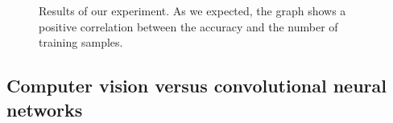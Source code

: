 \begin{figure}[h]
  \begin{center}
  \end{center}
  \label{fig:validaton-plot}
  \caption{Results of our experiment. As we expected, the graph shows a positive correlation between the accuracy and the number of training samples.}
\end{figure}


\subsection{Computer vision versus convolutional neural networks}

\begin{figure}[h]
  \begin{center}
  \end{center}
\end{figure}

